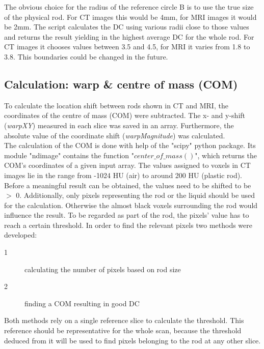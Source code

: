 The obvious choice for the radius of the reference circle B is to use the true size of the physical rod.
For CT images this would be 4mm, for MRI images it would be 2mm.
The script calculates the DC using various radii close to those values and returns the result yielding in the highest average DC for the whole rod.
For CT images it chooses values between 3.5 and 4.5, for MRI it varies from 1.8 to 3.8.
This boundaries could be changed in the future.


\subsection{Calculation: warp \& centre of mass (COM)}
\label{sec:COM}

To calculate the location shift between rods shown in CT and MRI, the coordinates of the centre of mass (COM) were subtracted.
The x- and y-shift (\textit{warpXY}) measured in each slice was saved in an array.
Furthermore, the absolute value of the coordinate shift (\textit{warpMagnitude}) was calculated.\\

The calculation of the COM is done with help of the "scipy" python package.
Its module "ndimage" contains the function "$center\_of\_mass()$", which returns the COM's coordinates of a given input array.
The values assigned to voxels in CT images lie in the range from -1024 HU (air) to around 200 HU (plastic rod).
Before a meaningful result can be obtained, the values need to be shifted to be $>$ 0.
Additionally, only pixels representing the rod or the liquid should be used for the calculation.
Otherwise the almost black voxels surrounding the rod would influence the result.
To be regarded as part of the rod, the pixels' value has to reach a certain threshold.
In order to find the relevant pixels two methods were developed:

\begin{description}
 \item[1] calculating the number of pixels based on rod size
 \item[2] finding a COM resulting in good DC
\end{description}

Both methods rely on a single reference slice to calculate the threshold.
This reference should be representative for the whole scan, because the threshold deduced from it will be used to find pixels belonging to the rod at any other slice.\\

